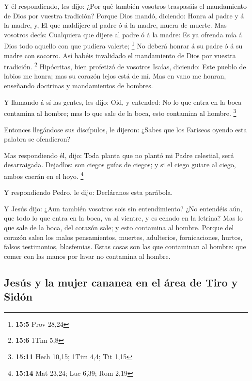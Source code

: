  Y él respondiendo, les dijo: ¿Por qué también vosotros
traspasáis el mandamiento de Dios por vuestra tradición? 
Porque Dios mandó, diciendo: Honra al padre y á la madre, y, El que
maldijere al padre ó á la madre, muera de muerte.  Mas
vosotros decís: Cualquiera que dijere al padre ó á la madre: Es ya
ofrenda mía á Dios todo aquello con que pudiera valerte; \footnote{\textbf{15:5}
  Prov 28,24}  No deberá honrar á su padre ó á su madre con
socorro. Así habéis invalidado el mandamiento de Dios por vuestra
tradición. \footnote{\textbf{15:6} 1Tim 5,8}  Hipócritas,
bien profetizó de vosotros Isaías, diciendo:  Este pueblo de
labios me honra; mas su corazón lejos está de mí.  Mas en
vano me honran, enseñando doctrinas y mandamientos de hombres.

 Y llamando á sí las gentes, les dijo: Oid, y entended:
 No lo que entra en la boca contamina al hombre; mas lo que
sale de la boca, esto contamina al hombre. \footnote{\textbf{15:11} Hech
  10,15; 1Tim 4,4; Tit 1,15}

 Entonces llegándose sus discípulos, le dijeron: ¿Sabes que
los Fariseos oyendo esta palabra se ofendieron?

 Mas respondiendo él, dijo: Toda planta que no plantó mi
Padre celestial, será desarraigada.  Dejadlos: son ciegos
guías de ciegos; y si el ciego guiare al ciego, ambos caerán en el hoyo.
\footnote{\textbf{15:14} Mat 23,24; Luc 6,39; Rom 2,19}

 Y respondiendo Pedro, le dijo: Decláranos esta parábola.

 Y Jesús dijo: ¿Aun también vosotros sois sin
entendimiento?  ¿No entendéis aún, que todo lo que entra en
la boca, va al vientre, y es echado en la letrina?  Mas lo
que sale de la boca, del corazón sale; y esto contamina al hombre.
 Porque del corazón salen los malos pensamientos, muertes,
adulterios, fornicaciones, hurtos, falsos testimonios, blasfemias.
 Estas cosas son las que contaminan al hombre: que comer
con las manos por lavar no contamina al hombre.

\hypertarget{jesuxfas-y-la-mujer-cananea-en-el-uxe1rea-de-tiro-y-siduxf3n}{%
\subsection{Jesús y la mujer cananea en el área de Tiro y
Sidón}\label{jesuxfas-y-la-mujer-cananea-en-el-uxe1rea-de-tiro-y-siduxf3n}}

